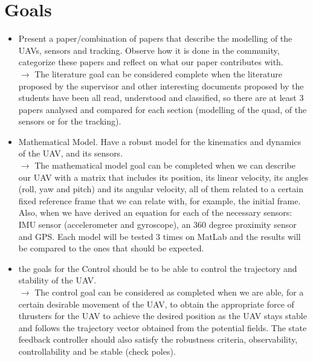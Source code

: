 \documentclass{article}
\begin{document}
	\section{Goals}	 
	\begin{itemize}
		\item Present a paper/combination of papers that describe the modelling of the UAVs, sensors and tracking. Observe how it is done in the community, categorize these papers and reflect on what our paper contributes with.\\  
		$\rightarrow$ The literature goal can be considered complete when the literature proposed by the supervisor and other interesting documents proposed by the students have been all read, understood and classified, so there are at least 3 papers analysed and compared for each section (modelling of the quad, of the sensors or for the tracking). %
	
		\item Mathematical Model. Have a robust model for the kinematics and dynamics of the UAV, and its sensors.\\
		$\rightarrow$ The mathematical model goal can be completed when we can describe our UAV with a matrix that includes its position, its linear velocity, its angles (roll, yaw and pitch) and its angular velocity, all of them related to a certain fixed reference frame that we can relate with, for example, the initial frame. Also, when we have derived an equation for each of the necessary sensors: IMU sensor (accelerometer and gyroscope), an 360 degree proximity sensor and GPS. Each model will be tested 3 times on MatLab and the results will be compared to the ones that should be expected.
		
		\item the goals for the Control should be to be able to control the trajectory and stability of the UAV. \\
		$\rightarrow$ The control goal can be considered as completed when we are able, for a certain desirable movement of the UAV, to obtain the appropriate force of thrusters for the UAV to achieve the desired position as the UAV stays stable and follows the trajectory vector obtained from the potential fields. The state feedback controller should also satisfy the robustness criteria, observability, controllability and be stable (check poles).
		

\end{itemize}
\end{document}
